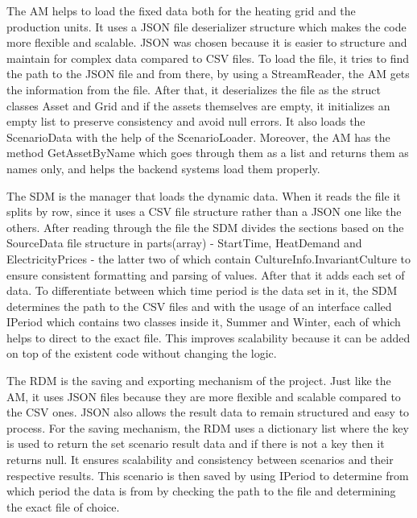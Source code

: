 The AM helps to load the fixed data both for the heating grid and the production units. It uses a JSON file deserializer structure which makes the code more flexible and scalable. JSON was chosen because it is easier to structure and maintain for complex data compared to CSV files. To load the file, it tries to find the path to the JSON file and from there, by using a StreamReader, the AM gets the information from the file. After that, it deserializes the file as the struct classes Asset and Grid and if the assets themselves are empty, it initializes an empty list to preserve consistency and avoid null errors. It also loads the ScenarioData with the help of the ScenarioLoader. Moreover, the AM has the method GetAssetByName which goes through them as a list and returns them as names only, and helps the backend systems load them properly.\par

The SDM is the manager that loads the dynamic data. When it reads the file it splits by row, since it uses a CSV file structure rather than a JSON one like the others. After reading through the file the SDM divides the sections based on the SourceData file structure in parts(array) - StartTime, HeatDemand and ElectricityPrices - the latter two of which contain CultureInfo.InvariantCulture to ensure consistent formatting and parsing of values. After that it adds each set of data. To differentiate between which time period is the data set in it, the SDM determines the path to the CSV files and with the usage of an interface called IPeriod which contains two classes inside it, Summer and Winter, each of which helps to direct to the exact file. This improves scalability because it can be added on top of the existent code without changing the logic.\par

The RDM is the saving and exporting mechanism of the project. Just like the AM, it uses JSON files because they are more flexible and scalable compared to the CSV ones. JSON also allows the result data to remain structured and easy to process. For the saving mechanism, the RDM uses a dictionary list where the key is used to return the set scenario result data and if there is not a key then it returns null. It ensures scalability and consistency between scenarios and their respective results. This scenario is then saved by using IPeriod to determine from which period the data is from by checking the path to the file and determining the exact file of choice.\par

